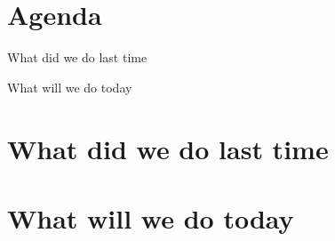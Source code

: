 \documentclass[11pt]{meetingmins}
\begin{document}
\maketitle

\section{Agenda}
\begin{hiddenitems}
	\item What did we do last time
	\item What will we do today
\end{hiddenitems}

\section{What did we do last time}
\begin{results}
	\sjoerd{}
	\nils{}
	\loek{}
	\tobias{}
\end{results}

\vspace{1em}

\section{What will we do today}
\begin{results}
	\sjoerd{}
	\nils{}
	\loek{}
	\tobias{}
\end{results}


\end{document}
